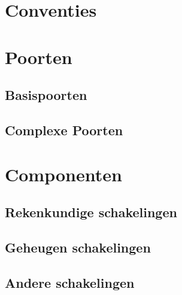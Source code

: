 \section{Conventies}
\section{Poorten}
\subsection{Basispoorten}
\subsection{Complexe Poorten}
\label{ssc:appendixComplexePoorten}
\section{Componenten}
\subsection{Rekenkundige schakelingen}
\subsection{Geheugen schakelingen}
\subsection{Andere schakelingen}
